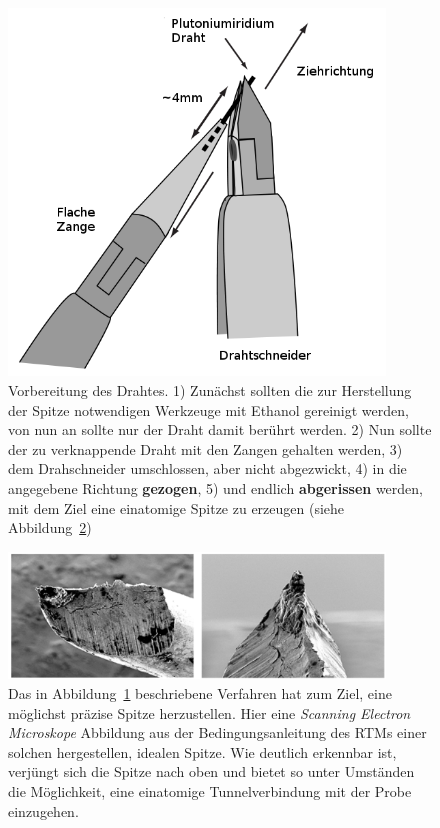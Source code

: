 \begin{figure}
\includegraphics[width=10cm]{pics/prepare_tip2}
\caption{Vorbereitung des Drahtes. 1) Zunächst sollten die
zur Herstellung der Spitze notwendigen Werkzeuge mit Ethanol
gereinigt werden, von nun an sollte nur der Draht damit berührt 
werden. 2) Nun sollte der zu verknappende Draht mit den Zangen
gehalten werden, 3) dem Drahschneider umschlossen, aber nicht
abgezwickt, 4) in die angegebene Richtung \textbf{gezogen}, 5)
und endlich \textbf{abgerissen} werden, mit dem Ziel eine 
einatomige Spitze zu erzeugen (siehe Abbildung~\ref{fig:SEM_tip_picture})}
 \label{fig:prepare_tip}
\end{figure}

\begin{figure}
\includegraphics[width=10cm]{pics/SEM_tip_picture}
\caption{Das in Abbildung~\ref{fig:prepare_tip} beschriebene
Verfahren hat zum Ziel, eine möglichst präzise Spitze herzustellen.
Hier eine \textit{Scanning Electron Microskope} Abbildung
aus der Bedingungsanleitung des RTMs 
einer solchen hergestellen, idealen Spitze. Wie deutlich erkennbar
ist, verjüngt sich die Spitze nach oben und bietet so unter 
Umständen die Möglichkeit, eine einatomige Tunnelverbindung
mit der Probe einzugehen.}
 \label{fig:SEM_tip_picture}

\end{figure}
